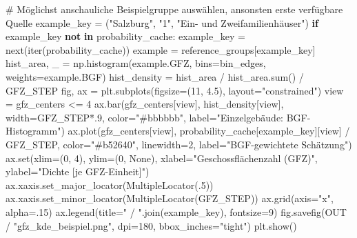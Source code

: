 \documentclass[
  ngerman,
  a4paper,
  DIV=11]{scrreprt}
\newenvironment{Shaded}{\begin{snugshade}}{\end{snugshade}}
\newcommand{\BuiltInTok}[1]{\textcolor[rgb]{0.00,0.23,0.31}{#1}}
\newcommand{\CommentTok}[1]{\textcolor[rgb]{0.37,0.37,0.37}{#1}}
\newcommand{\ControlFlowTok}[1]{\textcolor[rgb]{0.00,0.23,0.31}{\textbf{#1}}}
\newcommand{\DecValTok}[1]{\textcolor[rgb]{0.68,0.00,0.00}{#1}}
\newcommand{\FloatTok}[1]{\textcolor[rgb]{0.68,0.00,0.00}{#1}}
\newcommand{\KeywordTok}[1]{\textcolor[rgb]{0.00,0.23,0.31}{\textbf{#1}}}
\newcommand{\NormalTok}[1]{\textcolor[rgb]{0.00,0.23,0.31}{#1}}
\newcommand{\OperatorTok}[1]{\textcolor[rgb]{0.37,0.37,0.37}{#1}}
\newcommand{\StringTok}[1]{\textcolor[rgb]{0.13,0.47,0.30}{#1}}
\newcommand{\VariableTok}[1]{\textcolor[rgb]{0.07,0.07,0.07}{#1}}
\begin{document}
\begin{Shaded}
\begin{Highlighting}[]
\CommentTok{\# Möglichst anschauliche Beispielgruppe auswählen, ansonsten erste verfügbare Quelle}
\NormalTok{example\_key }\OperatorTok{=}\NormalTok{ (}\StringTok{"Salzburg"}\NormalTok{, }\StringTok{"1"}\NormalTok{, }\StringTok{"Ein{-} und Zweifamilienhäuser"}\NormalTok{)}
\ControlFlowTok{if}\NormalTok{ example\_key }\KeywordTok{not} \KeywordTok{in}\NormalTok{ probability\_cache:}
\NormalTok{    example\_key }\OperatorTok{=} \BuiltInTok{next}\NormalTok{(}\BuiltInTok{iter}\NormalTok{(probability\_cache))}
\NormalTok{example }\OperatorTok{=}\NormalTok{ reference\_groups[example\_key]}
\NormalTok{hist\_area, \_ }\OperatorTok{=}\NormalTok{ np.histogram(example.GFZ, bins}\OperatorTok{=}\NormalTok{bin\_edges, weights}\OperatorTok{=}\NormalTok{example.BGF)}
\NormalTok{hist\_density }\OperatorTok{=}\NormalTok{ hist\_area }\OperatorTok{/}\NormalTok{ hist\_area.}\BuiltInTok{sum}\NormalTok{() }\OperatorTok{/}\NormalTok{ GFZ\_STEP}
\NormalTok{fig, ax }\OperatorTok{=}\NormalTok{ plt.subplots(figsize}\OperatorTok{=}\NormalTok{(}\DecValTok{11}\NormalTok{, }\FloatTok{4.5}\NormalTok{), layout}\OperatorTok{=}\StringTok{"constrained"}\NormalTok{)}
\NormalTok{view }\OperatorTok{=}\NormalTok{ gfz\_centers }\OperatorTok{\textless{}=} \DecValTok{4}
\NormalTok{ax.bar(gfz\_centers[view], hist\_density[view], width}\OperatorTok{=}\NormalTok{GFZ\_STEP}\OperatorTok{*}\FloatTok{.9}\NormalTok{,}
\NormalTok{       color}\OperatorTok{=}\StringTok{"\#bbbbbb"}\NormalTok{, label}\OperatorTok{=}\StringTok{"Einzelgebäude: BGF{-}Histogramm"}\NormalTok{)}
\NormalTok{ax.plot(gfz\_centers[view], probability\_cache[example\_key][view] }\OperatorTok{/}\NormalTok{ GFZ\_STEP,}
\NormalTok{        color}\OperatorTok{=}\StringTok{"\#b52640"}\NormalTok{, linewidth}\OperatorTok{=}\DecValTok{2}\NormalTok{, label}\OperatorTok{=}\StringTok{"BGF{-}gewichtete Schätzung"}\NormalTok{)}
\NormalTok{ax.}\BuiltInTok{set}\NormalTok{(xlim}\OperatorTok{=}\NormalTok{(}\DecValTok{0}\NormalTok{, }\DecValTok{4}\NormalTok{), ylim}\OperatorTok{=}\NormalTok{(}\DecValTok{0}\NormalTok{, }\VariableTok{None}\NormalTok{), xlabel}\OperatorTok{=}\StringTok{"Geschossflächenzahl (GFZ)"}\NormalTok{,}
\NormalTok{       ylabel}\OperatorTok{=}\StringTok{"Dichte [je GFZ{-}Einheit]"}\NormalTok{)}
\NormalTok{ax.xaxis.set\_major\_locator(MultipleLocator(}\FloatTok{.5}\NormalTok{))}
\NormalTok{ax.xaxis.set\_minor\_locator(MultipleLocator(GFZ\_STEP))}
\NormalTok{ax.grid(axis}\OperatorTok{=}\StringTok{"x"}\NormalTok{, alpha}\OperatorTok{=}\FloatTok{.15}\NormalTok{)}
\NormalTok{ax.legend(title}\OperatorTok{=}\StringTok{" / "}\NormalTok{.join(example\_key), fontsize}\OperatorTok{=}\DecValTok{9}\NormalTok{)}
\NormalTok{fig.savefig(OUT }\OperatorTok{/} \StringTok{"gfz\_kde\_beispiel.png"}\NormalTok{, dpi}\OperatorTok{=}\DecValTok{180}\NormalTok{, bbox\_inches}\OperatorTok{=}\StringTok{"tight"}\NormalTok{)}
\NormalTok{plt.show()}
\end{Highlighting}
\end{Shaded}
\end{document}

